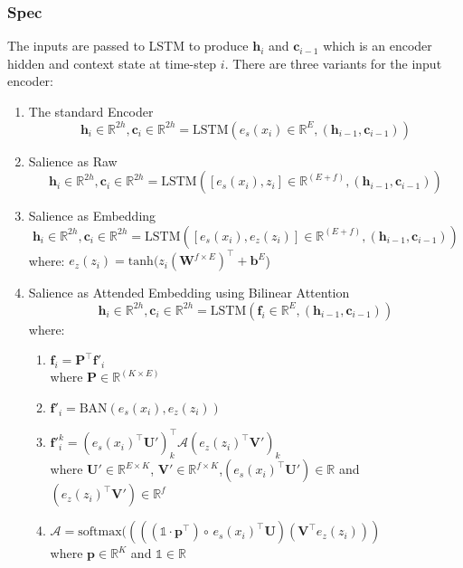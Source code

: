 \documentclass{article}
\begin{document}
  \subsubsection{Spec}
  The inputs are passed to LSTM to produce $\mathbf{h}_i$ and $\mathbf{c}_{i-1}$ which is an encoder hidden and context state at time-step $i$.
  There are three variants for the input encoder:
  \begin{enumerate}
    \item The standard Encoder
    \[
      \mathbf{h}_i \in \mathbb{R}^{2h}, \mathbf{c}_i \in \mathbb{R}^{2h} = \text{LSTM}(e_s(x_i) \in \mathbb{R}^E, (\mathbf{h}_{i-1}, \mathbf{c}_{i-1}))
    \]
    \item Salience as Raw
    \[
      \mathbf{h}_i \in \mathbb{R}^{2h}, \mathbf{c}_i \in \mathbb{R}^{2h} = \text{LSTM}([e_s(x_i), z_i] \in \mathbb{R}^{(E+f)}, (\mathbf{h}_{i-1}, \mathbf{c}_{i-1}))
    \]
    \item Salience as Embedding
    \[
      \mathbf{h}_i \in \mathbb{R}^{2h}, \mathbf{c}_i \in \mathbb{R}^{2h} = \text{LSTM}([e_s(x_i), e_z(z_i)] \in \mathbb{R}^{(E+f)}, (\mathbf{h}_{i-1}, \mathbf{c}_{i-1}))
    \]
    where:
    $e_z(z_i) = \text{tanh} (z_i (\mathbf{W}^{f\times E})^\intercal + \mathbf{b}^E$)
    \item Salience as Attended Embedding using Bilinear Attention 
    \[
      \mathbf{h}_i \in \mathbb{R}^{2h}, \mathbf{c}_i \in \mathbb{R}^{2h} = \text{LSTM}(\mathbf{f}_i \in \mathbb{R}^E, (\mathbf{h}_{i-1}, \mathbf{c}_{i-1}))
    \]
    where:
    \begin{enumerate}
      \item $\mathbf{f}_i = \mathbf{P}^\intercal \mathbf{f'}_i$ \\
      where $\mathbf{P} \in \mathbb{R}^{(K\times E)}$
      \item $\mathbf{f'}_i = \text{BAN}(e_s(x_i), e_z(z_i))$
      \item $\mathbf{f'}_i^k = (e_s(x_i)^\intercal \mathbf{U}')^\intercal_k\mathcal{A}(e_z(z_i)^\intercal\mathbf{V}')_k$\\
      where $\mathbf{U}'\in \mathbb{R}^{E\times K}$, $\mathbf{V}' \in \mathbb{R}^{f\times K}$,$(e_s(x_i)^\intercal \mathbf{U}') \in \mathbb{R}$ and $(e_z(z_i)^\intercal\mathbf{V}')\in\mathbb{R}^f$
      \item $\mathcal{A} = \text{softmax} ((((\mathds{1}\cdot \mathbf{p}^\intercal)\circ\, e_s(x_i)^\intercal \mathbf{U})(\mathbf{V}^\intercal e_z(z_i)))$ \\
      where $\mathbf{p}\in\mathbb{R}^K$ and $\mathds{1}\in\mathbb{R}$
    \end{enumerate}

  \end{enumerate}
  
\end{document}
